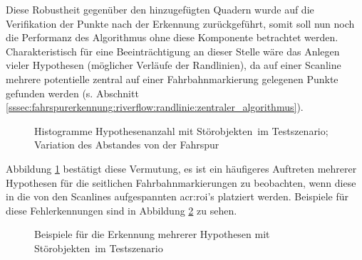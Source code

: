 Diese Robustheit gegenüber den hinzugefügten Quadern wurde auf die Verifikation der Punkte nach der Erkennung zurückgeführt, somit soll nun noch die Performanz des Algorithmus ohne diese Komponente betrachtet werden. Charakteristisch für eine Beeinträchtigung an dieser Stelle wäre das Anlegen vieler Hypothesen (möglicher Verläufe der Randlinien), da auf einer Scanline mehrere potentielle zentral auf einer Fahrbahnmarkierung gelegenen Punkte gefunden werden (s. Abschnitt \ref{sssec:fahrspurerkennung:riverflow:randlinie:zentraler_algorithmus}).
\begin{figure}[htbp] %
{}
\hfill
{}
\hfill
{}
\hfill
{}
\caption{Histogramme Hypothesenanzahl mit \glqq Störobjekten\grqq\ im Testszenario; Variation des Abstandes von der Fahrspur}
\label{fig:evaluation:riverflow:hypos_hists}
\end{figure}

Abbildung \ref{fig:evaluation:riverflow:hypos_hists} bestätigt diese Vermutung, es ist ein häufigeres Auftreten mehrerer Hypothesen für die seitlichen Fahrbahnmarkierungen zu beobachten, wenn diese in die von den Scanlines aufgespannten \gls{acr:roi}'s platziert werden. Beispiele für diese Fehlerkennungen sind in Abbildung \ref{fig:evaluation:riverflow:hypos_riverflow_plots} zu sehen.
\begin{figure}[htbp] %
{}
\hfill
{}
\hfill
{}
\hfill
{}
\caption{Beispiele für die Erkennung mehrerer Hypothesen mit \glqq Störobjekten\grqq\ im Testszenario}
\label{fig:evaluation:riverflow:hypos_riverflow_plots}
\end{figure}

